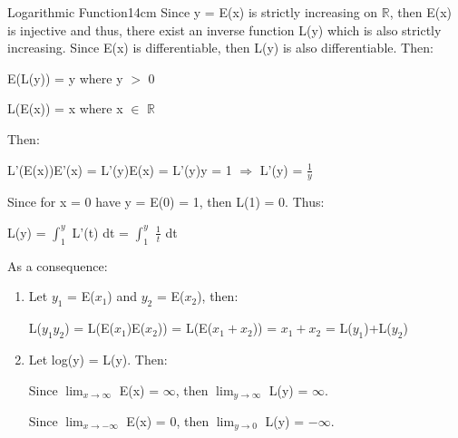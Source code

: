     \begin{definition}{Logarithmic Function}{14cm}
        Since y = E(x) is strictly increasing on $\mathbb{R}$, then E(x) is injective
        and thus, there exist an inverse function L(y) which is also strictly
        increasing. Since E(x) is differentiable, then L(y) is also
        differentiable. Then:

        \hspace{0.5cm}
        E(L(y)) = y
        \hspace{1cm}
        where y $>$ 0

        \hspace{0.5cm}
        L(E(x)) = x
        \hspace{1cm}
        where x $\in$ $\mathbb{R}$

        Then:

        \hspace{0.5cm}
        L'(E(x))E'(x) = L'(y)E(x) = L'(y)y = 1
        \hspace{1cm}
        $\Rightarrow$
        \hspace{1cm}
        L'(y) = $\frac{1}{y}$

        Since for x = 0 have y = E(0) = 1, then L(1) = 0.
        Thus:

        \hspace{0.5cm}
        L(y) = $\int_1^y$ L'(t) dt
        = $\int_1^y$ $\frac{1}{t}$ dt

        As a consequence:

        \begin{enumerate}[label=(\alph*), leftmargin=1.5cm, itemsep=0.1cm]
            \item Let $y_1$ = E($x_1$) and $y_2$ = E($x_2$), then:
            
                \hspace{0.5cm}
                L($y_1y_2$)
                = L(E($x_1$)E($x_2$))
                = L(E($x_1+x_2$))
                = $x_1+x_2$
                = L($y_1$)+L($y_2$)

            \item Let log(y) = L(y). Then:
            
                \hspace{0.5cm}
                Since $\lim_{x \rightarrow \infty}$ E(x) = $\infty$,
                then $\lim_{y \rightarrow \infty}$ L(y) = $\infty$.

                \hspace{0.5cm}
                Since $\lim_{x \rightarrow -\infty}$ E(x) = 0,
                then $\lim_{y \rightarrow 0}$ L(y) = $-\infty$.


\end{enumerate}
\end{definition}
